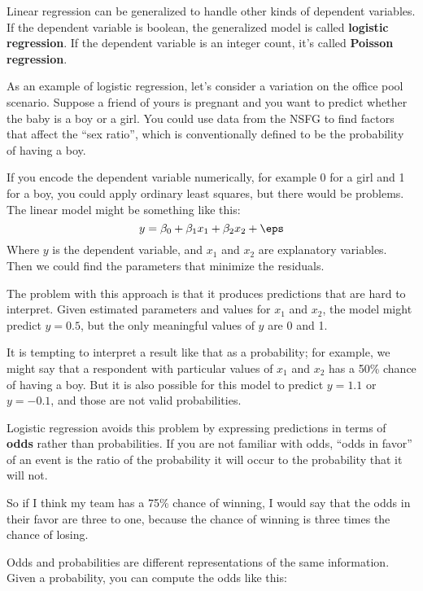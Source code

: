 Linear regression can be generalized to handle other kinds of
dependent variables.  If the dependent variable is boolean, the
generalized model is called {\bf logistic regression}.  If the dependent
variable is an integer count, it's called {\bf Poisson
regression}.

As an example of logistic regression, let's consider a variation
on the office pool scenario.
Suppose
a friend of yours is pregnant and you want to predict whether the
baby is a boy or a girl.  You could use data from the NSFG to find
factors that affect the ``sex ratio'', which is conventionally
defined to be the probability
of having a boy.

If you encode the dependent variable numerically, for example 0 for a
girl and 1 for a boy, you could apply ordinary least squares, but
there would be problems.  The linear model might be something like
this:
%
\[ y = \beta_0 + \beta_1 x_1 + \beta_2 x_2 + \eps \]
%
Where $y$ is the dependent variable, and $x_1$ and $x_2$ are
explanatory variables.  Then we could find the parameters that
minimize the residuals.

The problem with this approach is that it produces predictions that
are hard to interpret.  Given estimated parameters and values for
$x_1$ and $x_2$, the model might predict $y=0.5$, but the only
meaningful values of $y$ are 0 and 1.

It is tempting to interpret a result like that as a probability; for
example, we might say that a respondent with particular values of
$x_1$ and $x_2$ has a 50\% chance of having a boy.  But it is also
possible for this model to predict $y=1.1$ or $y=-0.1$, and those
are not valid probabilities.

Logistic regression avoids this problem by expressing predictions in
terms of {\bf odds} rather than probabilities.  If you are not
familiar with odds, ``odds in favor'' of an event is the ratio of the
probability it will occur to the probability that it will not.

So if I think my team has a 75\% chance of winning, I would
say that the odds in their favor are three to one, because
the chance of winning is three times the chance of losing.

Odds and probabilities are different representations of the same
information.  Given a probability, you can compute the odds like this:


